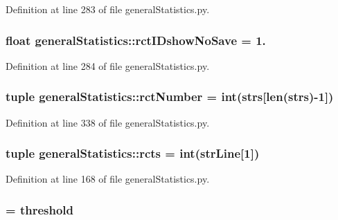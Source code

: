 \-Definition at line 283 of file general\-Statistics.\-py.

\hypertarget{namespacegeneral_statistics_a18f6111b43faa560d8b42f29ec031377}{
\subsubsection[{rct\-I\-Dshow\-No\-Save}]{\setlength{\rightskip}{0pt plus 5cm}float {\bf general\-Statistics\-::rct\-I\-Dshow\-No\-Save} = 1.}}\label{namespacegeneral_statistics_a18f6111b43faa560d8b42f29ec031377}


\-Definition at line 284 of file general\-Statistics.\-py.

\hypertarget{namespacegeneral_statistics_ab24b721d76ddf791f3097efe4da17080}{
\subsubsection[{rct\-Number}]{\setlength{\rightskip}{0pt plus 5cm}tuple {\bf general\-Statistics\-::rct\-Number} = int({\bf strs}\mbox{[}len({\bf strs})-\/1\mbox{]})}}\label{namespacegeneral_statistics_ab24b721d76ddf791f3097efe4da17080}


\-Definition at line 338 of file general\-Statistics.\-py.

\hypertarget{namespacegeneral_statistics_a96c2985cd728ad6a5b6b5da7ae6d410e}{
\subsubsection[{rcts}]{\setlength{\rightskip}{0pt plus 5cm}tuple {\bf general\-Statistics\-::rcts} = int({\bf str\-Line}\mbox{[}1\mbox{]})}}\label{namespacegeneral_statistics_a96c2985cd728ad6a5b6b5da7ae6d410e}


\-Definition at line 168 of file general\-Statistics.\-py.

\hypertarget{namespacegeneral_statistics_a4403e02b267a59338d77f9a53f9893c2}{
\subsubsection[{real\-Theshold}]{ = {\bf threshold}}}\label{namespacegeneral_statistics_a4403e02b267a59338d77f9a53f9893c2}



